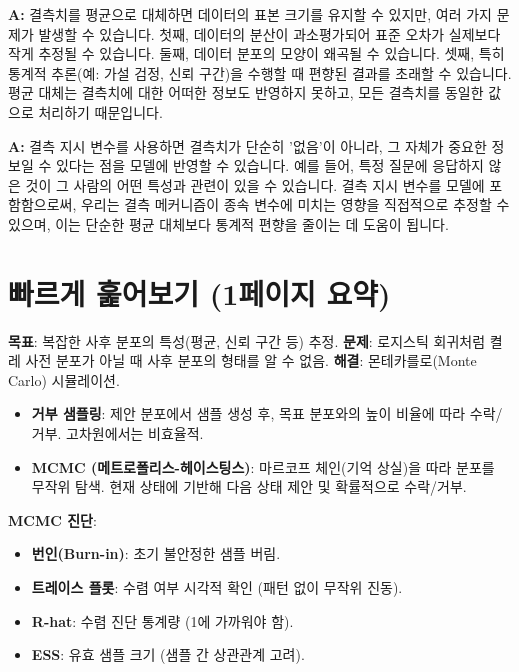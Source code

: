 \documentclass[11pt,a4paper]{article}
\begin{document}
\begin{tcolorbox}[mybox={Q: 결측치를 단순히 평균으로 대체하는 것이 왜 문제가 될 수 있나요?}]
\textbf{A:} 결측치를 평균으로 대체하면 데이터의 표본 크기를 유지할 수 있지만, 여러 가지 문제가 발생할 수 있습니다. 첫째, 데이터의 분산이 과소평가되어 표준 오차가 실제보다 작게 추정될 수 있습니다. 둘째, 데이터 분포의 모양이 왜곡될 수 있습니다. 셋째, 특히 통계적 추론(예: 가설 검정, 신뢰 구간)을 수행할 때 편향된 결과를 초래할 수 있습니다. 평균 대체는 결측치에 대한 어떠한 정보도 반영하지 못하고, 모든 결측치를 동일한 값으로 처리하기 때문입니다.
\end{tcolorbox}

\begin{tcolorbox}[mybox={Q: 결측 지시 변수를 사용하는 것이 왜 더 나은 방법인가요?}]
\textbf{A:} 결측 지시 변수를 사용하면 결측치가 단순히 '없음'이 아니라, 그 자체가 중요한 정보일 수 있다는 점을 모델에 반영할 수 있습니다. 예를 들어, 특정 질문에 응답하지 않은 것이 그 사람의 어떤 특성과 관련이 있을 수 있습니다. 결측 지시 변수를 모델에 포함함으로써, 우리는 결측 메커니즘이 종속 변수에 미치는 영향을 직접적으로 추정할 수 있으며, 이는 단순한 평균 대체보다 통계적 편향을 줄이는 데 도움이 됩니다.
\end{tcolorbox}

\newpage
\section*{빠르게 훑어보기 (1페이지 요약)}

\begin{tcolorbox}[summarybox={베이즈 사후 분포 샘플링}]
\textbf{목표}: 복잡한 사후 분포의 특성(평균, 신뢰 구간 등) 추정.
\textbf{문제}: 로지스틱 회귀처럼 켤레 사전 분포가 아닐 때 사후 분포의 형태를 알 수 없음.
\textbf{해결}: 몬테카를로(Monte Carlo) 시뮬레이션.
\begin{itemize}
    \item \textbf{거부 샘플링}: 제안 분포에서 샘플 생성 후, 목표 분포와의 높이 비율에 따라 수락/거부. 고차원에서는 비효율적.
    \item \textbf{MCMC (메트로폴리스-헤이스팅스)}: 마르코프 체인(기억 상실)을 따라 분포를 무작위 탐색. 현재 상태에 기반해 다음 상태 제안 및 확률적으로 수락/거부.
\end{itemize}
\textbf{MCMC 진단}:
\begin{itemize}
    \item \textbf{번인(Burn-in)}: 초기 불안정한 샘플 버림.
    \item \textbf{트레이스 플롯}: 수렴 여부 시각적 확인 (패턴 없이 무작위 진동).
    \item \textbf{R-hat}: 수렴 진단 통계량 (1에 가까워야 함).
    \item \textbf{ESS}: 유효 샘플 크기 (샘플 간 상관관계 고려).
\end{itemize}
\end{tcolorbox}
\end{document}
